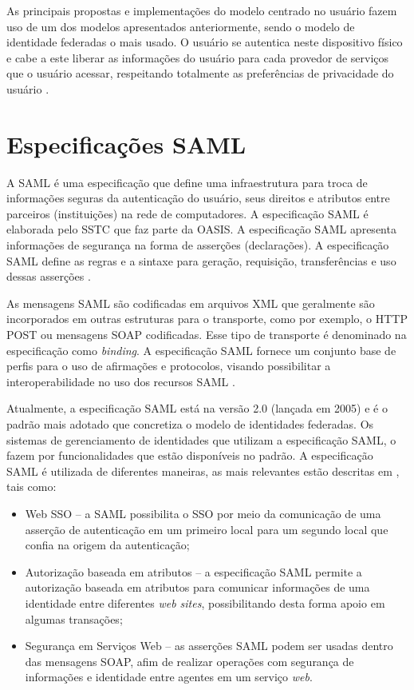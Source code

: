 As principais propostas e implementações do modelo centrado no usuário fazem uso de um dos modelos apresentados anteriormente, sendo o modelo de identidade federadas o mais usado. O usuário se autentica neste dispositivo físico e cabe a este liberar as informações do usuário para cada provedor de serviços que o usuário acessar, respeitando totalmente as preferências de privacidade do usuário \cite{wangham:10b}.

\section{Especificações SAML}
\label{s_c2_saml}

A \acf{SAML} é uma especificação que define uma infraestrutura para troca de informações seguras da autenticação do usuário, seus direitos e atributos entre parceiros (instituições) na rede de computadores. A especificação SAML é elaborada pelo \ac{SSTC} que faz parte da \ac{OASIS}. A especificação SAML apresenta informações de segurança na forma de asserções (declarações). A especificação SAML define as regras e a sintaxe para geração, requisição, transferências e uso dessas asserções \cite{wangham:10b, oasis:08}.

As mensagens SAML são codificadas em arquivos XML que geralmente são incorporados em outras estruturas para o transporte, como por exemplo, o HTTP POST ou mensagens \ac{SOAP} codificadas. Esse tipo de transporte é denominado na especificação como \textit{binding}. A especificação SAML fornece um conjunto base de perfis para o uso de afirmações e protocolos, visando possibilitar a interoperabilidade no uso dos recursos SAML \cite{oasis:08, macaneiro:13}.

Atualmente, a especificação SAML está na versão 2.0 (lançada em 2005) e é o padrão mais adotado que concretiza o modelo de identidades federadas. Os sistemas de gerenciamento de identidades que utilizam a especificação SAML, o fazem por funcionalidades que estão disponíveis no padrão. A especificação SAML é utilizada de diferentes maneiras, as mais relevantes estão descritas em \cite{oasis:08}, tais como:

\begin{itemize}
 \item Web SSO -- a SAML possibilita o SSO por meio da comunicação de uma asserção de autenticação em um primeiro local para um segundo local que confia na origem da autenticação;
 \item Autorização baseada em atributos -- a especificação SAML permite a autorização baseada em atributos para comunicar informações de uma identidade entre diferentes \textit{web sites}, possibilitando desta forma apoio em algumas transações;
 \item Segurança em Serviços Web -- as asserções SAML podem ser usadas dentro das mensagens SOAP, afim de realizar operações com segurança de informações e identidade entre agentes em um serviço \textit{web}.
\end{itemize}


